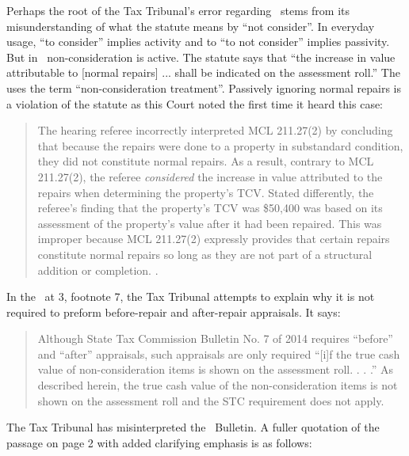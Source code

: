 \documentclass[12pt,\documentclassflag]{michiganCourtOfAppealsBrief}
\begin{document}
Perhaps the root of the Tax Tribunal's error regarding \mathieuGast\ stems from its misunderstanding of what the statute means by ``not consider''. In everyday usage, ``to consider'' implies activity and to ``to not consider'' implies passivity. But in \mathieuGast\ non-consideration is active. The statute says that ``the increase in value attributable to [normal repairs] ... shall be indicated on the assessment roll.'' The \cite[s]{STC Bulletin 7 of 2014} uses the term ``non-consideration treatment''. Passively ignoring normal repairs is a violation of the statute as this Court noted the first time it heard this case:

\begin{quote}
  The hearing referee incorrectly interpreted MCL 211.27(2) by concluding that because the repairs were done to a property in substandard condition, they did not constitute normal repairs. As a result, contrary to MCL 211.27(2), the referee \textit{considered} the increase in value attributed to the repairs when determining the property's TCV. Stated differently, the referee's finding that the property's TCV was \$50,400 was based on its assessment of the property's value after it had been repaired. This was improper because MCL 211.27(2) expressly provides that certain repairs constitute normal repairs so long as they are not part of a structural addition or completion. .
\end{quote}

In the \orderDenying\ at 3, footnote 7, the Tax Tribunal attempts to explain why it is not required to preform before-repair and after-repair appraisals. It says: 

\begin{quote}
	Although State Tax Commission Bulletin No. 7 of 2014 requires ``before'' and ``after'' appraisals, such appraisals are only required ``[i]f the true cash value of non-consideration items is shown on the assessment roll. . . .'' As described herein, the true cash value of the non-consideration items is not shown on the assessment roll and the STC requirement does not apply.
\end{quote}

The Tax Tribunal has misinterpreted the \STC\ Bulletin. A fuller quotation of the passage on page 2 with added clarifying emphasis is as follows:
\end{document}
